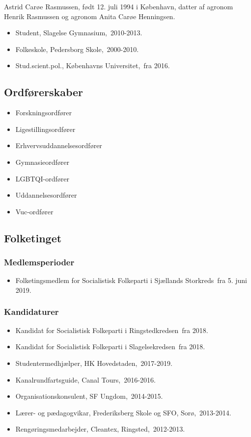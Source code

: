 \documentclass[11pt, a4paper]{awesome-cv}
\begin{document}
\makecvheader[R]
\makelettertitle
\begin{cvletter}
Astrid Carøe Rasmussen, født 12. juli 1994 i København, datter af agronom Henrik Rasmussen og agronom Anita Carøe Henningsen.

\begin{itemize}
\item Student, Slagelse Gymnasium, 2010-2013.
\item Folkeskole, Pedersborg Skole, 2000-2010.
\item Stud.scient.pol., Københavns Universitet, fra 2016.
\end{itemize}
\subsection*{Ordførerskaber}
\begin{itemize}
\item Forskningsordfører
\item Ligestillingsordfører
\item Erhvervsuddannelsesordfører
\item Gymnasieordfører
\item LGBTQI-ordfører
\item Uddannelsesordfører
\item Vuc-ordfører
\end{itemize}
\subsection*{Folketinget}
\subsubsection*{Medlemsperioder}
\begin{itemize}
\item Folketingsmedlem for Socialistisk Folkeparti i Sjællands Storkreds fra 5. juni 2019.
\end{itemize}
\subsubsection*{Kandidaturer}
\begin{itemize}
\item Kandidat for Socialistisk Folkeparti i Ringstedkredsen fra 2018.
\item Kandidat for Socialistisk Folkeparti i Slagelsekredsen fra 2018.
\end{itemize}
\begin{itemize}
\item Studentermedhjælper, HK Hovedstaden, 2017-2019.
\item Kanalrundfartsguide, Canal Tours, 2016-2016.
\item Organisationskonsulent, SF Ungdom, 2014-2015.
\item Lærer- og pædagogvikar, Frederiksberg Skole og SFO, Sorø, 2013-2014.
\item Rengøringsmedarbejder, Cleantex, Ringsted, 2012-2013.
\end{itemize}
\end{cvletter}
\end{document}
